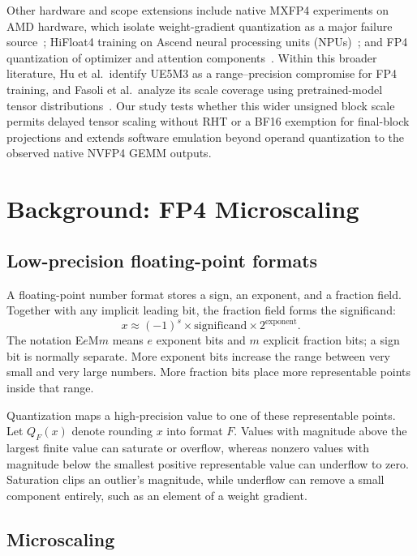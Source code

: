 \documentclass[11pt]{article}
\newcommand{\ue}{UE5M3}
\newcommand{\nv}{NVFP4}
\begin{document}
Other hardware and scope extensions include native MXFP4 experiments on AMD
hardware, which isolate weight-gradient quantization as a major failure
source~\citep{cim2026mxfp4}; HiFloat4 training on Ascend neural processing
units (NPUs)~\citep{taghian2026hifloat4}; and FP4 quantization of optimizer and attention
components~\citep{ding2026fullstack}.  Within this broader literature, Hu et
al.\ identify \ue{} as a range--precision compromise for FP4 training, and
Fasoli et al.\ analyze its scale coverage using pretrained-model tensor
distributions~\citep{hu2025designspace,fasoli2026finer}.  Our study tests
whether this wider unsigned block scale permits delayed tensor scaling without
RHT or a BF16 exemption for final-block projections and extends software emulation beyond operand
quantization to the observed native \nv{} GEMM outputs.

\section{Background: FP4 Microscaling}

\subsection{Low-precision floating-point formats}

A floating-point number format stores a sign, an exponent, and a fraction
field.  Together with any implicit leading bit, the fraction field forms the
significand:
\begin{equation}
  x \approx (-1)^s \times \text{significand} \times 2^{\text{exponent}}.
\end{equation}
The notation E$e$M$m$ means $e$ exponent bits and $m$ explicit fraction bits;
a sign bit is normally separate.  More exponent bits increase the range between
very small and very large numbers.  More fraction bits place more representable
points inside that range.

Quantization maps a high-precision value to one of these representable points.
Let $Q_F(x)$ denote rounding $x$ into format $F$.  Values with magnitude above
the largest finite value can saturate or overflow, whereas nonzero values with
magnitude below the smallest positive representable value can underflow to
zero.  Saturation clips an outlier's magnitude, while underflow can remove a
small component entirely, such as an element of a weight gradient.

\subsection{Microscaling}
\end{document}
